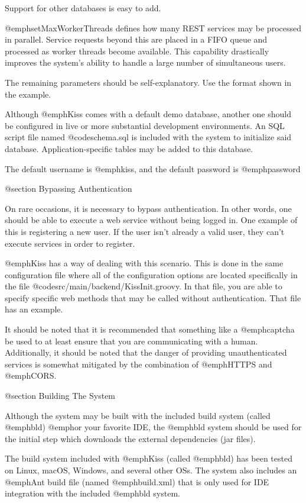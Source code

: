Support for other databases is easy to add.

@emph{setMaxWorkerThreads} defines how many REST services may be
processed in parallel.  Service requests beyond this are placed in a
FIFO queue and processed as worker threads become available.  This
capability drastically improves the system's ability to handle a large
number of simultaneous users.

The remaining parameters should be self-explanatory.  Use the format
shown in the example.

Although @emph{Kiss} comes with a default demo database, another one
should be configured in live or more substantial development
environments.  An SQL script file named @code{schema.sql} is included
with the system to initialize said database.  Application-specific tables
may be added to this database.

The default username is @emph{kiss}, and the default password is
@emph{password}

@section Bypassing Authentication

On rare occasions, it is necessary to bypass authentication.  In other
words, one should be able to execute a web service without being logged in.  One
example of this is registering a new user.  If the user isn't already a
valid user, they can't execute services in order to register.

@emph{Kiss} has a way of dealing with this scenario.  This is done in
the same configuration file where all of the configuration options are
located specifically in the file @code{src/main/backend/KissInit.groovy}.  In
that file, you are able to specify specific web methods that may be
called without authentication.  That file has an example.

It should be noted that it is recommended that something like a
@emph{captcha} be used to at least ensure that you are
communicating with a human.  Additionally, it should be noted that the
danger of providing unauthenticated services is somewhat mitigated by
the combination of @emph{HTTPS} and @emph{CORS}.

@section Building The System

Although the system may be built with the included build system
(called @emph{bld}) @emph{or} your favorite IDE, the @emph{bld}
system should be used for the initial step which downloads the external
dependencies (jar files).

The build system included with @emph{Kiss} (called @emph{bld}) has
been tested on Linux, macOS, Windows, and several other OSs.  The
system also includes an @emph{Ant} build file (named @emph{build.xml})
that is only used for IDE integration with the included @emph{bld}
system.

